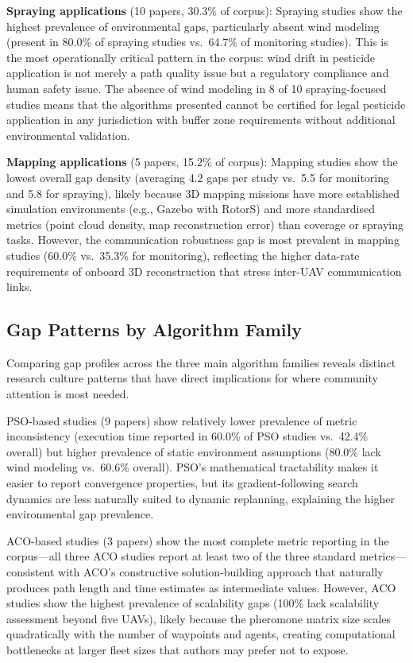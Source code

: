 \documentclass[review,3p,times]{elsarticle}
\begin{document}
\textbf{Spraying applications} (10 papers, 30.3\% of corpus): Spraying studies show the highest prevalence of environmental gaps, particularly absent wind modeling (present in 80.0\% of spraying studies vs.\ 64.7\% of monitoring studies). This is the most operationally critical pattern in the corpus: wind drift in pesticide application is not merely a path quality issue but a regulatory compliance and human safety issue. The absence of wind modeling in 8 of 10 spraying-focused studies means that the algorithms presented cannot be certified for legal pesticide application in any jurisdiction with buffer zone requirements without additional environmental validation.

\textbf{Mapping applications} (5 papers, 15.2\% of corpus): Mapping studies show the lowest overall gap density (averaging 4.2 gaps per study vs.\ 5.5 for monitoring and 5.8 for spraying), likely because 3D mapping missions have more established simulation environments (e.g., Gazebo with RotorS) and more standardised metrics (point cloud density, map reconstruction error) than coverage or spraying tasks. However, the communication robustness gap is most prevalent in mapping studies (60.0\% vs.\ 35.3\% for monitoring), reflecting the higher data-rate requirements of onboard 3D reconstruction that stress inter-UAV communication links.

\subsection{Gap Patterns by Algorithm Family}

Comparing gap profiles across the three main algorithm families reveals distinct research culture patterns that have direct implications for where community attention is most needed.

PSO-based studies (9 papers) show relatively lower prevalence of metric inconsistency (execution time reported in 60.0\% of PSO studies vs.\ 42.4\% overall) but higher prevalence of static environment assumptions (80.0\% lack wind modeling vs.\ 60.6\% overall). PSO's mathematical tractability makes it easier to report convergence properties, but its gradient-following search dynamics are less naturally suited to dynamic replanning, explaining the higher environmental gap prevalence.

ACO-based studies (3 papers) show the most complete metric reporting in the corpus---all three ACO studies report at least two of the three standard metrics---consistent with ACO's constructive solution-building approach that naturally produces path length and time estimates as intermediate values. However, ACO studies show the highest prevalence of scalability gaps (100\% lack scalability assessment beyond five UAVs), likely because the pheromone matrix size scales quadratically with the number of waypoints and agents, creating computational bottlenecks at larger fleet sizes that authors may prefer not to expose.
\end{document}
